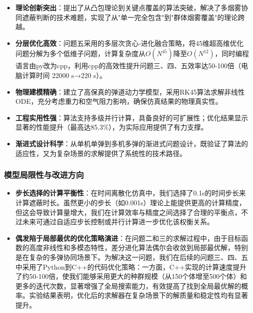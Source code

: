\documentclass[fontset=SimSun]{ctexart}
\begin{document}
\begin{itemize}[leftmargin=1.5cm]
    \item \textbf{理论创新突出}：提出了从凸包理论到关键点覆盖的算法突破，解决了多烟雾协同遮蔽判断的技术难题，实现了从"单一完全包含"到"群体烟雾覆盖"的理论跨越。
    
    \item \textbf{分层优化高效}：问题五采用的多层次贪心-进化融合策略，将45维超高维优化问题分解为多个低维子问题，计算复杂度从$O(N^{45})$降至$O(N^{12})$，同时编程语言由py改为cpp，利用cpp的高效性提升问题三、四、五效率达50-100倍（电脑计算时间 22000 s→220 s）。
    
    \item \textbf{物理建模精确}：建立了高保真的弹道动力学模型，采用RK45算法求解非线性ODE，充分考虑重力和空气阻力影响，确保仿真结果的物理真实性。
    
    \item \textbf{工程实用性强}：算法支持多级并行计算，具备良好的可扩展性；优化结果显示显著的性能提升（最高达85.3\%），为实际应用提供了有力支撑。
    
    \item \textbf{渐进式设计科学}：从单机单弹到多机多弹的渐进式问题设计，既验证了算法的适应性，又为复杂场景的求解提供了系统性的技术路径。
\end{itemize}

\subsubsection{模型局限性与改进方向}

\begin{itemize}[leftmargin=1.5cm]
     \item \textbf{步长选择的计算平衡性}：在时间离散化仿真中，我们选择了0.1s的时间步长来计算遮蔽时长。虽然更小的步长（如0.001s）理论上能提供更高的计算精度，但这会导致计算量增大，我们在计算效率与精度之间选择了合理的平衡点，不过未来可通过自适应步长控制或并行计算进一步优化该权衡关系。
    
    \item \textbf{偶发陷于局部最优的优化策略演进}：在问题二和三的求解过程中，由于目标函数的高度非线性和多模态特性，差分进化算法偶尔会收敛到局部最优解，特别是在复杂的多弹协同场景下。为解决这一问题，我们在后续的问题三、四、五中采用了Python到C++的代码优化策略：一方面，C++实现的计算速度提升了约50-100倍，使我们能够采用更大的种群规模（从150个体增至500个体）和更多的迭代次数，显著增强了全局搜索能力，有效提高了找到全局最优解的概率。实验结果表明，优化后的求解器在复杂场景下的解质量和稳定性均有显著提升。
    
\end{itemize}
\newpage
\appendix
\end{document}
